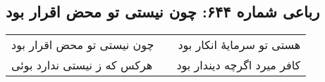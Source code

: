 \begin{center}
\section*{رباعی شماره ۶۴۴: چون نیستی تو محض اقرار بود}
\label{sec:0644}
\begin{longtable}{l p{0.5cm} r}
چون نیستی تو محض اقرار بود
&&
هستی تو سرمایهٔ انکار بود
\\
هرکس که ز نیستی ندارد بوئی
&&
کافر میرد اگرچه دیندار بود
\\
\end{longtable}
\end{center}
